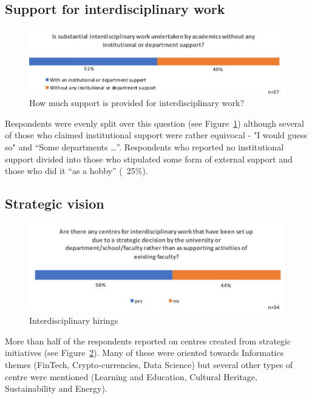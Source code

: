 \subsection{Support for interdisciplinary work}

\begin{figure}[h]
\centering
\includegraphics[width = \linewidth]{charts/5h.jpg}
\caption{How much support is provided for interdisciplinary work?}
\label{sect5:support}
\end{figure}

Respondents were evenly split over this question (see Figure~\ref{sect5:support}) although several of those who claimed institutional support were rather equivocal - "I would guess so" and ``Some departments \ldots ''. Respondents who reported no institutional support divided into those who stipulated some form of external support and those who did it ``as a hobby'' (~25\%).

\subsection{Strategic vision }
\begin{figure}[h]
\centering
\includegraphics[width = \linewidth]{charts/5i.jpg}
\caption{Interdisciplinary hirings}
\label{sect5:strategy}
\end{figure}

More than half of the respondents reported on centres created from strategic initiatives (see Figure~\ref{sect5:strategy}). Many of these were oriented towards Informatics themes (FinTech, Crypto-currencies, Data Science) but several other types of centre were mentioned (Learning and Education, Cultural Heritage, Sustainability and Energy).

